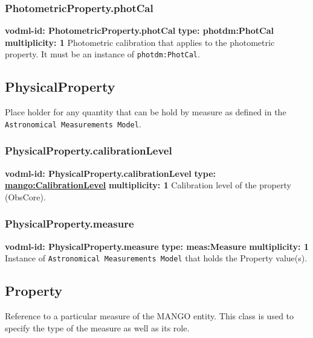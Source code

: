     \subsubsection{PhotometricProperty.photCal}
      \textbf{vodml-id: PhotometricProperty.photCal} \newline
      \textbf{type: photdm:PhotCal} \newline
      \textbf{multiplicity: 1} \newline 
      Photometric calibration that applies to the photometric property. It must be an instance of \texttt{photdm:PhotCal}.

  \subsection{PhysicalProperty}
  \label{sect:PhysicalProperty}
    Place holder for any quantity that can be hold by measure as defined in the \texttt{Astronomical Measurements Model}.

    \subsubsection{PhysicalProperty.calibrationLevel}
      \textbf{vodml-id: PhysicalProperty.calibrationLevel} \newline
      \textbf{type: \hyperref[sect:CalibrationLevel]{mango:CalibrationLevel}} \newline
      \textbf{multiplicity: 1} \newline 
      Calibration level of the property (ObsCore).

    \subsubsection{PhysicalProperty.measure}
      \textbf{vodml-id: PhysicalProperty.measure} \newline
      \textbf{type: meas:Measure} \newline
      \textbf{multiplicity: 1} \newline 
      Instance of \texttt{Astronomical Measurements Model} that holds the Property value(s).

  \subsection{Property}
  \label{sect:Property}
    Reference to a particular measure of the MANGO entity. This class is used to specify the type of the measure as well as its role.

